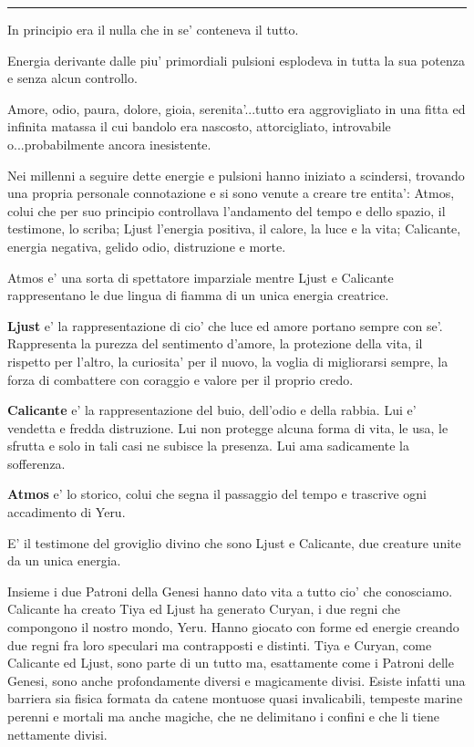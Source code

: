 \documentclass[a4paper,11pt,twoside,openany]{dndbook}
\begin{document}
{\noindent\rule{\textwidth}{1pt}

\bigskip

In principio era il nulla che in se' conteneva il tutto.

Energia derivante dalle piu' primordiali pulsioni esplodeva in tutta la sua potenza e senza alcun controllo.

Amore, odio, paura, dolore, gioia, serenita'...tutto era aggrovigliato in una fitta ed infinita matassa il cui bandolo era nascosto, attorcigliato, introvabile o...probabilmente ancora inesistente.

Nei millenni a seguire dette energie e pulsioni hanno iniziato a scindersi, trovando una propria personale connotazione e si sono venute a creare tre entita': Atmos, colui che per suo principio controllava l'andamento del tempo e dello spazio, il testimone, lo scriba; Ljust l'energia positiva, il calore, la luce e la vita; Calicante, energia negativa, gelido odio, distruzione e morte.

Atmos e' una sorta di spettatore imparziale mentre Ljust e Calicante rappresentano le due lingua di fiamma di un unica energia creatrice.

\textbf{Ljust} e' la rappresentazione di cio' che luce ed amore portano sempre con se'. Rappresenta la purezza del sentimento d'amore, la protezione della vita, il rispetto per l'altro, la curiosita' per il nuovo, la voglia di migliorarsi sempre, la forza di combattere con coraggio e valore per il proprio credo.

\textbf{Calicante} e' la rappresentazione del buio, dell'odio e della rabbia. Lui e' vendetta e fredda distruzione. Lui non protegge alcuna forma di vita, le usa, le sfrutta e solo in tali casi ne subisce la presenza. Lui ama sadicamente la sofferenza. 
 
\textbf{Atmos} e' lo storico, colui che segna il passaggio del tempo e trascrive ogni accadimento di Yeru.

E' il testimone del groviglio divino che sono Ljust e Calicante, due creature unite da un unica energia.

Insieme i due Patroni della Genesi hanno dato vita a tutto cio' che conosciamo. Calicante ha creato Tiya ed Ljust ha generato Curyan, i due regni che compongono il nostro mondo, Yeru. Hanno giocato con forme ed energie creando due regni fra loro speculari ma contrapposti e distinti. Tiya e Curyan, come Calicante ed Ljust, sono parte di un tutto ma, esattamente come i Patroni delle Genesi, sono anche profondamente diversi e magicamente divisi. Esiste infatti una barriera sia fisica formata da catene montuose quasi invalicabili, tempeste marine perenni e mortali ma anche magiche, che ne delimitano i confini e che li tiene nettamente divisi.

}
\end{document}
